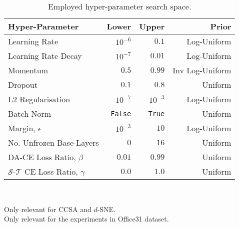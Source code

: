\documentclass[journal]{IEEEtran}
\newcommand{\Src}{\mathcal{S}} \newcommand{\Tgt}{\mathcal{T}}
\begin{document}
\begin{table}
	\begin{center}
	\caption{Employed hyper-parameter search space.}
	\label{tab:search-space}
	\begin{tabular}{lrrr}
		\toprule
        Hyper-Parameter 
		    & Lower
		    & Upper
		    & Prior
            \\
		\midrule
		Learning Rate
    		& $10^{-6}$
    		& $0.1$	
    		& Log-Uniform
    		\\
	    Learning Rate Decay
    	    & $10^{-7}$
    		& $0.01$
    		& Log-Uniform
    		\\
        Momentum 
            & $0.5$
    		& $0.99$
    		& Inv Log-Uniform
    		\\
    	Dropout
            & $0.1$
    		& $0.8$
    		& Uniform
    		\\
    	L2 Regularisation
            & $10^{-7}$
    		& $10^{-3}$
    		& Log-Uniform
    		\\
    	Batch Norm
            & \texttt{False}
    		& \texttt{True}
    		& Uniform
    		\\
    	Margin, $\epsilon$ \textsuperscript{\textsection}
            & $10^{-3}$
    		& $10$
    		& Log-Uniform
    		\\
    	No. Unfrozen Base-Layers \textsuperscript{\textparagraph}
            & $0$
    		& $16$
    		& Uniform
    		\\
    	DA-CE Loss Ratio, $\beta$ 
            & $0.01$
    		& $0.99$	
    		& Uniform	
    		\\
    	$\Src$-$\Tgt$ CE Loss Ratio, $\gamma$
            & $0.0$
    		& $1.0$
    		& Uniform
    		\\
		\bottomrule
	\end{tabular}\\
	\end{center}
	\textsuperscript{\textsection}Only relevant for CCSA and $d$-SNE.\\
	\textsuperscript{\textparagraph}Only relevant for the experiments in Office31 dataset.
\end{table}
\end{document}
